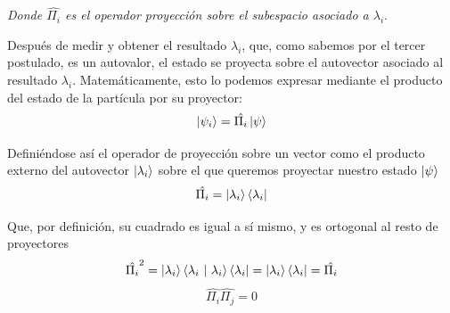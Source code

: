 \documentclass{article}
\numberwithin{equation}{section} %
\begin{document}
    \vspace{2mm}
    \textit{Donde \( \hat{\Pi_{i}} \) es el operador proyección sobre el subespacio asociado a \( \lambda_{i} \)}.
    
    \vspace{5mm}

    Después de medir y obtener el resultado \( \lambda_{i} \), que, como sabemos por el tercer postulado, es un autovalor, el estado se proyecta sobre el autovector asociado al resultado \( \lambda_{i} \). Matemáticamente, esto lo podemos expresar mediante el producto del estado de la partícula por su proyector:
    \begin{equation}
        \ket{\psi_{i}} = \hat{\Pi_{i}} \ket{\psi}
        \label{eq: proyeccion_estado}
    \end{equation}

    \vspace{1.5mm}

    Definiéndose así el operador de proyección sobre un vector como el producto externo del autovector \( \ket{\lambda_{i}} \) sobre el que queremos proyectar nuestro estado \( \ket{\psi} \)
    \begin{equation*}
        \hat{\Pi_{i}} = \ket{\lambda_{i}} \bra{\lambda_{i}}
    \end{equation*} 

    \vspace{1.5mm}

    Que, por definición, su cuadrado es igual a sí mismo, y es ortogonal al resto de proyectores
    \begin{equation*}
        \hat{\Pi_{i}} ^ {2} = \ket{\lambda_{i}} \braket{\lambda_{i} \ | \ \lambda_{i}} \bra{\lambda_{i}} = \ket{\lambda_{i}} \bra{\lambda_{i}} = \hat{\Pi_{i}}
    \end{equation*}
    \begin{equation*}
        \hat{\Pi_{i}} \hat{\Pi_{j}} = 0
    \end{equation*}

    \vspace{1.5mm}
\end{document}
